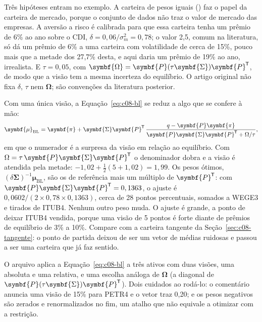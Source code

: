 Três hipóteses entram no exemplo. A carteira de pesos iguais () faz o papel da carteira de mercado, porque o conjunto de dados não traz o valor de mercado das empresas. A aversão a risco é calibrada para que essa carteira tenha um prêmio de 6\% ao ano sobre o CDI, $\delta = 0,06/\sigma_m^2 = 0,78$; o valor 2,5, comum na literatura, só dá um prêmio de 6\% a uma carteira com volatilidade de cerca de 15\%, pouco mais que a metade dos 27,7\% desta, e aqui daria um prêmio de 19\% ao ano, irrealista. E $\tau = 0,05$, com $\symbf{\Omega} = \symbf{P}(\tau\symbf{\Sigma})\symbf{P}\T$, de modo que a visão tem a mesma incerteza do equilíbrio. O artigo original não fixa $\delta$, $\tau$ nem $\symbf{\Omega}$; são convenções da literatura posterior.

Com uma única visão, a Equação~\eqref{eq:c08-bl} se reduz a algo que se confere à mão:
\begin{equation}
  \symbf{\mu}_{\text{BL}} = \symbf{\pi} + \symbf{\Sigma}\symbf{P}\T\,
  \frac{q - \symbf{P}\symbf{\pi}}{\symbf{P}\symbf{\Sigma}\symbf{P}\T + \Omega/\tau} ,
  \label{eq:c08-bl1}
\end{equation}
em que o numerador é a surpresa da visão em relação ao equilíbrio. Com $\Omega = \tau\,\symbf{P}\symbf{\Sigma}\symbf{P}\T$ o denominador dobra e a visão é atendida pela metade: $-1,02 + \tfrac12(5 + 1,02) = 1,99$. Os pesos ótimos, $(\delta\symbf{\Sigma})^{-1}\symbf{\mu}_{\text{BL}}$, são os de referência mais um múltiplo de $\symbf{P}\T$: com $\symbf{P}\symbf{\Sigma}\symbf{P}\T = 0,1363$, o ajuste é $0,0602/(2 \times 0,78 \times 0,1363)$, cerca de 28 pontos percentuais, somados a WEGE3 e tirados de ITUB4. Nenhum outro peso muda. O ajuste é grande, a ponto de deixar ITUB4 vendida, porque uma visão de 5 pontos é forte diante de prêmios de equilíbrio de 3\% a 10\%. Compare com a carteira tangente da Seção~\ref{sec:c08-tangente}: o ponto de partida deixou de ser um vetor de médias ruidosas e passou a ser uma carteira que já faz sentido.

\begin{repositorio}
O arquivo  aplica a Equação~\eqref{eq:c08-bl} a três ativos com duas visões, uma absoluta e uma relativa, e uma escolha análoga de $\symbf{\Omega}$ (a diagonal de $\symbf{P}(\tau\symbf{\Sigma})\symbf{P}\T$). Dois cuidados ao rodá-lo: o comentário anuncia uma visão de 15\% para PETR4 e o vetor  traz 0,20; e os pesos negativos são zerados e renormalizados no fim, um atalho que não equivale a otimizar com a restrição.
\end{repositorio}

